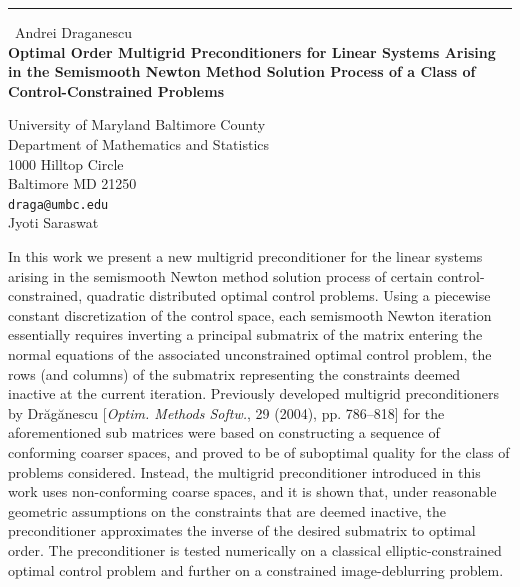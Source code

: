 \documentclass{report}
\begin{document}
\begin{center}
\rule{6in}{1pt} \
{\large Andrei Draganescu \\
{\bf Optimal Order Multigrid Preconditioners for Linear Systems Arising in the Semismooth Newton Method Solution Process of a Class of Control-Constrained Problems}}

University of Maryland Baltimore County \\ Department of Mathematics and Statistics \\ 1000 Hilltop Circle \\ Baltimore MD 21250
\\
{\tt draga@umbc.edu}\\
Jyoti Saraswat\end{center}

In this work we present a new multigrid preconditioner for the linear
systems arising in the semismooth Newton method solution process of
certain control-constrained, quadratic distributed optimal control
problems. Using a piecewise constant discretization of the control space,
each semismooth Newton iteration essentially
requires inverting a principal submatrix of the matrix entering the
normal equations of the associated unconstrained optimal control problem,
the rows (and columns) of the submatrix representing the constraints
deemed inactive at the current iteration. Previously developed multigrid
preconditioners by Dr{\u a}g{\u a}nescu
[\emph{Optim. Methods Softw.}, 29 (2004), pp. 786--818] for the
aforementioned sub matrices were based on constructing a sequence of
conforming coarser spaces, and proved to be of suboptimal quality for the
class of problems considered. Instead, the multigrid preconditioner
introduced in this work uses non-conforming coarse spaces, and it is
shown that, under reasonable geometric assumptions on the constraints
that are deemed inactive, the preconditioner approximates the inverse of
the desired submatrix to optimal order. The preconditioner is tested
numerically on a classical elliptic-constrained optimal control problem
and further on a constrained image-deblurring problem.
\end{document}
